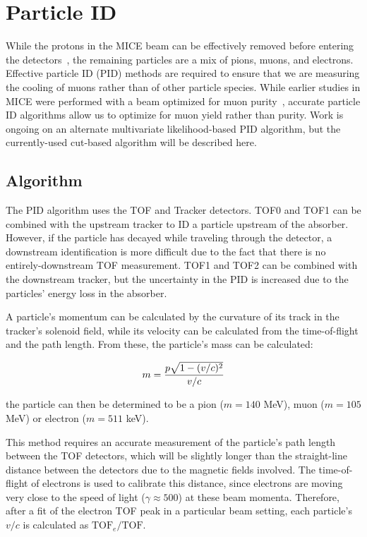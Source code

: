 \graphicspath{{07-PID/Figures/}}

\section{Particle ID}
\label{Sect:PID}

While the protons in the MICE beam can be effectively removed before entering the detectors~\cite{proton_absorber}, the remaining particles are a mix of pions, muons, and electrons.  Effective particle ID (PID) methods are required to ensure that we are measuring the cooling of muons rather than of other particle species.  While earlier studies in MICE were performed with a beam optimized for muon purity~\cite{pion_contamination}, accurate particle ID algorithms allow us to optimize for muon yield rather than purity. {\color{red}Work is ongoing on an alternate multivariate likelihood-based PID algorithm, but the currently-used cut-based algorithm will be described here.}

\subsection{Algorithm}
\label{SubSect:PID_Algo}

The PID algorithm uses the TOF and Tracker detectors.  TOF0 and TOF1 can be combined with the upstream tracker to ID a particle upstream of the absorber.  However, if the particle has decayed while traveling through the detector, a downstream identification is more difficult due to the fact that there is no entirely-downstream TOF measurement.  TOF1 and TOF2 can be combined with the downstream tracker, but the uncertainty in the PID is increased due to the particles' energy loss in the absorber.

A particle's momentum can be calculated by the curvature of its track in the tracker's solenoid field, while its velocity can be calculated from the time-of-flight and the path length.  From these, the particle's mass can be calculated:

\begin{equation}
\label{eq:pid_mass_calc} m = {p \sqrt{1-(v/c)^2} \over v/c}
\end{equation}

the particle can then be determined to be a pion ($m=140$ MeV), muon ($m=105$ MeV) or electron ($m=511$ keV).

This method requires an accurate measurement of the particle's path length between the TOF detectors, which will be slightly longer than the straight-line distance between the detectors due to the magnetic fields involved.  The time-of-flight of electrons is used to calibrate this distance, since electrons are moving very close to the speed of light ($\gamma \approx 500$) at these beam momenta.  Therefore, after a fit of the electron TOF peak in a particular beam setting, each particle's $v/c$ is calculated as $\mathrm{TOF}_e / \mathrm{TOF}$.


